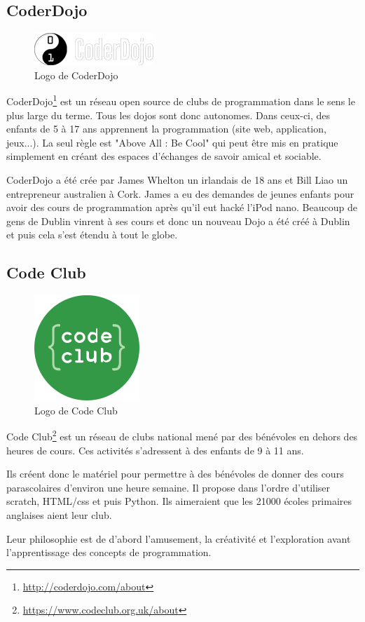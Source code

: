 \subsection{CoderDojo}
\begin{figure}[!h]
  \begin{center}
    \includegraphics[scale=0.5]{content/5-related_work/images/dojo}
    \caption{Logo de CoderDojo}
    \label{fig:coder dojo}
  \end{center}
\end{figure}
CoderDojo\footnote{\url{http://coderdojo.com/about}} est un réseau open source de clubs de programmation dans le sens le plus large du terme. Tous les dojos sont donc autonomes. Dans ceux-ci, des enfants de 5 à 17 ans apprennent la programmation (site web, application, jeux...). La seul règle est "Above All : Be Cool" qui peut être mis en pratique simplement en créant des espaces d'échanges de savoir amical et sociable.

CoderDojo a été crée par James Whelton un irlandais de 18 ans et Bill Liao un entrepreneur australien à Cork. James a eu des demandes de jeunes enfants pour avoir des cours de programmation après qu'il eut hacké l'iPod nano. Beaucoup de gens de Dublin vinrent à ses cours et donc un nouveau Dojo a été créé à Dublin et puis cela s'est étendu à tout le globe.

\subsection{Code Club}
\begin{figure}[!h]
  \begin{center}
    \includegraphics[scale=0.3]{content/5-related_work/images/club}
    \caption{Logo de Code Club}
    \label{fig:code club}
  \end{center}
\end{figure}
Code Club\footnote{\url{https://www.codeclub.org.uk/about}} est un réseau de clubs national mené par des bénévoles en dehors des heures de cours. Ces activités s'adressent à des enfants de 9 à 11 ans.

Ils créent donc le matériel pour permettre à des bénévoles de donner des cours parascolaires d'environ une heure semaine. Il propose dans l'ordre d'utiliser scratch, HTML/css et puis Python. Ils aimeraient que les 21000 écoles primaires anglaises aient leur club.

Leur philosophie est de d'abord l'amusement, la créativité et l'exploration avant l'apprentissage des concepts de programmation.
